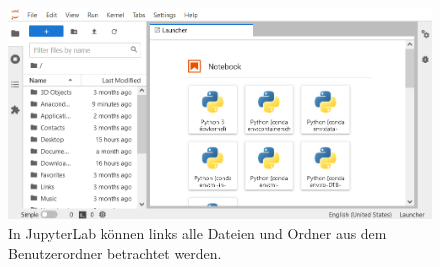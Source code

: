 \documentclass{tufte-handout}
\begin{document}
\begin{figure}[h]
  \includegraphics{jupyterlab-running}
  \caption{In JupyterLab können links alle Dateien und Ordner aus dem Benutzerordner betrachtet werden.}%
\label{fig:start-jupyterlab}
\end{figure}

\FloatBarrier{}
\doclicenseThis{}
\end{document}
